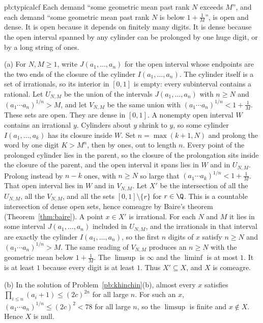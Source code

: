 \begin{solution}{pb:typicalcf}
\idea Each demand ``some geometric mean past rank $N$ exceeds $M$'', and each demand ``some geometric mean past rank $N$ is below $1+\frac1M$'', is open and dense. It is open because it depends on finitely many digits. It is dense because the open interval spanned by any cylinder can be prolonged by one huge digit, or by a long string of ones.

\writeup (a) For $N,M\ge 1$, write $J(a_1,\dots,a_n)$ for the open interval whose endpoints are the two ends of the closure of the cylinder $I(a_1,\dots,a_n)$. The cylinder itself is a set of irrationals, so its interior in $[0,1]$ is empty: every subinterval contains a rational. Let $U_{N,M}$ be the union of the intervals $J(a_1,\dots,a_n)$ with $n\ge N$ and $(a_1\cdots a_n)^{1/n}>M$, and let $V_{N,M}$ be the same union with $(a_1\cdots a_n)^{1/n}<1+\frac1M$. These sets are open. They are dense in $[0,1]$. A nonempty open interval $W$ contains an irrational $y$. Cylinders about $y$ shrink to $y$, so some cylinder $I(a_1,\dots,a_k)$ has its closure inside $W$. Set $n=\max(k+1,N)$ and prolong the word by one digit $K>M^n$, then by ones, out to length $n$. Every point of the prolonged cylinder lies in the parent, so the closure of the prolongation sits inside the closure of the parent, and the open interval it spans lies in $W$ and in $U_{N,M}$. Prolong instead by $n-k$ ones, with $n\ge N$ so large that $(a_1\cdots a_k)^{1/n}<1+\frac1M$. That open interval lies in $W$ and in $V_{N,M}$. Let $X'$ be the intersection of all the $U_{N,M}$, all the $V_{N,M}$, and all the sets $[0,1]\setminus\{r\}$ for $r\in\Q$. This is a countable intersection of dense open sets, hence comeagre by Baire's theorem (Theorem~\ref{thm:baire}). A point $x\in X'$ is irrational. For each $N$ and $M$ it lies in some interval $J(a_1,\dots,a_n)$ included in $U_{N,M}$, and the irrationals in that interval are exactly the cylinder $I(a_1,\dots,a_n)$, so the first $n$ digits of $x$ satisfy $n\ge N$ and $(a_1\cdots a_n)^{1/n}>M$. The same reading of $V_{N,M}$ produces an $n\ge N$ with the geometric mean below $1+\frac1M$. The $\limsup$ is $\infty$ and the $\liminf$ is at most $1$. It is at least $1$ because every digit is at least $1$. Thus $X'\subseteq X$, and $X$ is comeagre.

(b) In the solution of Problem~\ref{pb:khinchin}(b), almost every $x$ satisfies $\prod_{i\le n}(a_i+1)\le(2c)^{2n}$ for all large $n$. For such an $x$, $(a_1\cdots a_n)^{1/n}\le(2c)^2<78$ for all large $n$, so the $\limsup$ is finite and $x\notin X$. Hence $X$ is null.


\end{solution}
